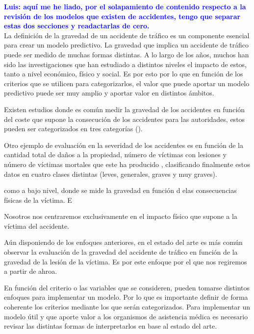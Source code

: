\documentclass{uathesis-es}
\begin{document}
\textcolor{blue}{\textbf{Luis: aquí me he liado, por el solapamiento de contenido respecto a la revisión de los modelos que existen de accidentes, tengo que separar estas dos secciones y readactarlas de cero.}}\\


La definición de la gravedad de un accidente de tráfico es un componente esencial para crear un modelo predictivo. La gravedad que implica un accidente de tráfico puede ser medido de muchas formas distintas. A lo largo de los años, muchos han sido las investigaciones que han estudiado a distintos niveles el impacto de estos, tanto a nivel económico, físico y social. Es por esto por lo que en función de los criterios que se utilicen para categorizarlos, el valor que puede aportar un modelo predictivo puede ser muy amplio y aportar valor en distintos ámbitos.

Existen estudios donde es común medir la gravedad de los accidentes en función del coste que supone la consecución de los accidentes para las autoridades, estos pueden ser categorizados en tres categorías ().

Otro ejemplo de evaluación en la severidad de los accidentes es en función de la cantidad total de daños a la propiedad, número de víctimas con lesiones y número de víctimas mortales que este ha producido \cite{Yang2023}, clasificando finalmente estos datos en cuatro clases distintas (leves, generales, graves y muy graves).


como a bajo nivel, donde se mide la gravedad en función d elas consecuencias físicas de la víctima. E


Nosotros nos centraremos exclusivamente en el impacto físico que supone a la víctima del accidente.

Aún disponiendo de los enfoques anteriores, en el estado del arte es más común observar la evaluación de la gravedad del accidente de tráfico en función de la gravedad de la lesión de la víctima. Es por este enfoque por el que nos regiremos a partir de ahroa.


En función del criterio o las variables que se consideren, pueden tomarse distintos enfoques para implementar un modelo. Por lo que es importante definir de forma coherente los criterios mediante los que serán categorizados. Para implementar un modelo útil y que aporte valor a los organismos de asistencia médica es necesario revisar las distintas formas de interpretarlos en base al estado del arte.
\end{document}
